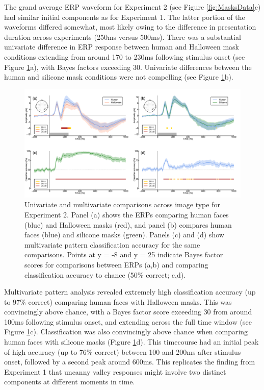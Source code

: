 \documentclass[
]{article}
\begin{document}
The grand average ERP waveform for Experiment 2 (see Figure \ref{fig:MasksData}c) had similar initial components as for Experiment 1. The latter portion of the waveforms differed somewhat, most likely owing to the difference in presentation duration across experiments (250ms versus 500ms). There was a substantial univariate difference in ERP response between human and Halloween mask conditions extending from around 170 to 230ms following stimulus onset (see Figure \ref{fig:MasksMVPA}a), with Bayes factors exceeding 30. Univariate differences between the human and silicone mask conditions were not compelling (see Figure \ref{fig:MasksMVPA}b).

\begin{figure}

{\centering \includegraphics{Figures/MasksMVPA} 

}

\caption{Univariate and multivariate comparisons across image type for Experiment 2. Panel (a) shows the ERPs comparing human faces (blue) and Halloween masks (red), and panel (b) compares human faces (blue) and silicone masks (green). Panels (c) and (d) show multivariate pattern classification accuracy for the same comparisons. Points at y = -8 and y = 25 indicate Bayes factor scores for comparisons between ERPs (a,b) and comparing classification accuracy to chance (50\% correct; c,d).}\label{fig:MasksMVPA}
\end{figure}

Multivariate pattern analysis revealed extremely high classification accuracy (up to 97\% correct) comparing human faces with Halloween masks. This was convincingly above chance, with a Bayes factor score exceeding 30 from around 100ms following stimulus onset, and extending across the full time window (see Figure \ref{fig:MasksMVPA}c). Classification was also convincingly above chance when comparing human faces with silicone masks (Figure \ref{fig:MasksMVPA}d). This timecourse had an initial peak of high accuracy (up to 76\% correct) between 100 and 200ms after stimulus onset, followed by a second peak around 600ms. This replicates the finding from Experiment 1 that uncanny valley responses might involve two distinct components at different moments in time.
\end{document}
